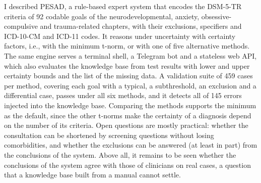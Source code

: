 I described PESAD, a rule-based expert system that encodes the DSM-5-TR
criteria of 92 codable goals of the neurodevelopmental, anxiety,
obsessive-compulsive and trauma-related chapters, with their exclusions,
specifiers and ICD-10-CM and ICD-11 codes. It reasons under uncertainty with
certainty factors, i.e., with the minimum t-norm, or with one of five
alternative methods. The same engine serves a terminal shell, a Telegram bot
and a stateless web API, which also evaluates the knowledge base from test
results with lower and upper certainty bounds and the list of the missing data.
A validation suite of 459 cases per method, covering each goal with a typical,
a subthreshold, an exclusion and a differential case, passes under all six
methods, and it detects all of 145 errors injected into the knowledge base. Comparing the methods supports the minimum as the default, since the other
t-norms make the certainty of a diagnosis depend on the number of its criteria.
Open questions are mostly practical: whether the consultation can be
shortened by screening questions without losing comorbidities, and whether the
exclusions can be answered (at least in part) from the conclusions of the
system. Above all, it remains to be seen whether the conclusions of the system
agree with those of clinicians on real cases, a question that a knowledge base
built from a manual cannot settle.
